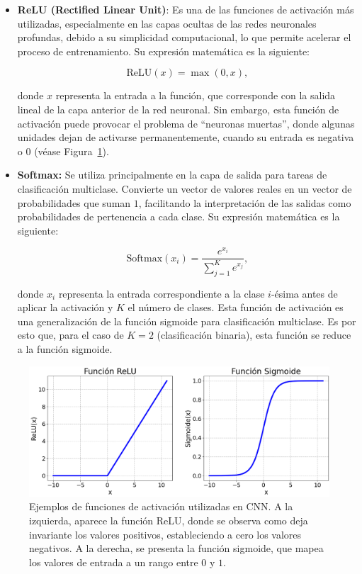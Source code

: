 \begin{itemize}
    \item \textbf{ReLU (Rectified Linear Unit)}: Es una de las funciones de activación más utilizadas, especialmente en las capas ocultas de las redes neuronales profundas, debido a su simplicidad computacional, lo que permite acelerar el proceso de entrenamiento. Su expresión matemática es la siguiente:
    
    \[
        \text{ReLU}(x) = \max(0, x),
    \]

    donde $x$ representa la entrada a la función, que corresponde con la salida lineal de la capa anterior de la red neuronal. Sin embargo, esta función de activación puede provocar el problema de ``neuronas muertas'', donde algunas unidades dejan de activarse permanentemente, cuando su entrada es negativa o $0$ (véase Figura~\ref{fig:funcionesactivacion}).

    \item \textbf{Softmax:} Se utiliza principalmente en la capa de salida para tareas de clasificación multiclase. Convierte un vector de valores reales en un vector de probabilidades que suman $1$, facilitando la interpretación de las salidas como probabilidades de pertenencia a cada clase. Su expresión matemática es la siguiente:
 
    \[
        \text{Softmax}(x_i) = \frac{e^{x_i}}{\sum_{j=1}^{K} e^{x_j}},
    \]

    donde $x_i$ representa la entrada correspondiente a la clase $i$-ésima antes de aplicar la activación y $K$ el número de clases. Esta función de activación es una generalización de la función sigmoide para clasificación multiclase. Es por esto que, para el caso de $K=2$ (clasificación binaria), esta función se reduce a la función sigmoide.

\end{itemize}

\begin{figure}[h]
    \centering
    \includegraphics[width=0.8\linewidth]{img/funcionesactivacion.png}
    \caption[Ejemplos de funciones de activación utilizadas en CNN.]{Ejemplos de funciones de activación utilizadas en CNN. A la izquierda, aparece la función ReLU, donde se observa como deja invariante los valores positivos, estableciendo a cero los valores negativos. A la derecha, se presenta la función sigmoide, que mapea los valores de entrada a un rango entre $0$ y $1$.}\label{fig:funcionesactivacion}
\end{figure}

